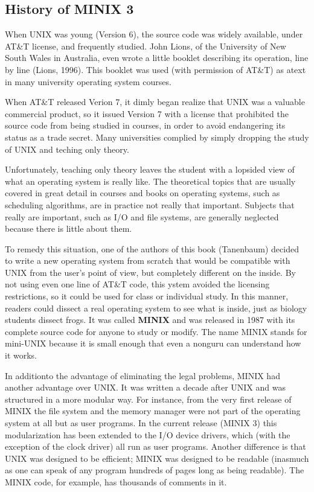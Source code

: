 \documentclass{book}
\newcommand {\kw}  [1] {\textbf{#1}}
\begin{document}
\subsection{History of MINIX 3}
When UNIX was young (Version 6), the source code was widely available, under AT\&T license, and frequently studied.
John Lions, of the University of New South Wales in Australia, even wrote a little booklet describing its operation, line by line (Lions, 1996).
This booklet was used (with permission of AT\&T) as atext in many university operating system courses.

When AT\&T released Verion 7, it dimly began realize that UNIX was a valuable commercial product, 
so it issued Version 7 with a license that prohibited the source code from being studied in courses, 
in order to avoid endangering its status as a trade secret. 
Many universities complied by simply dropping the study of UNIX and teching only theory.

Unfortunately, teaching only theory leaves the student with a lopsided view of what an operating system is really like.
The theoretical topics that are usually covered in great detail in courses and books on operating systems, 
such as scheduling algorithms, are in practice not really that important. 
Subjects that really are important, such as I/O and file systems, are generally neglected because there is little about them.

To remedy this situation, one of the authors of this book (Tanenbaum) decided to write a new operating system from scratch 
that would be compatible with UNIX from the user's point of view,  but completely different on the inside.
By not using even one line of AT\&T code, this ystem avoided the licensing restrictions, so it could be used for class or individual study.
In this manner, readers could dissect a real operating system to see what is inside, just as biology students dissect frogs.
It was called \kw{MINIX} and was released in 1987 with its complete source code for anyone to study or modify.
The name MINIX stands for mini-UNIX because it is small enough that even a nonguru can understand how it works.

In additionto the advantage of eliminating the legal problems, MINIX had another advantage over UNIX.
It was written a decade after UNIX and was structured in a more modular way.
For instance, from the very first release of MINIX the file system and the memory manager 
were not part of the operating system at all but as user programs.
In the current release (MINIX 3) this modularization has been extended to the I/O device drivers, 
which (with the exception of the clock driver) all run as user programs.
Another difference is that UNIX was designed to be efficient; MINIX was designed to be readable 
(inasmuch as one can speak of any program hundreds of pages long as being readable).
The MINIX code, for example, has thousands of comments in it.
\end{document}
